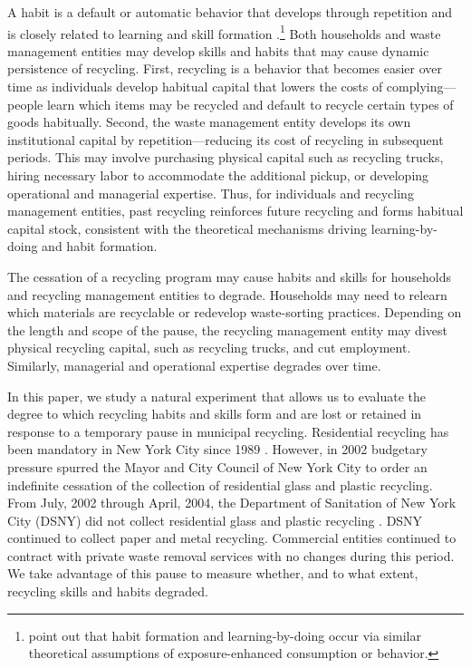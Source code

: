 \documentclass[12pt]{article}
\begin{document}
A habit is a default or automatic behavior that develops through repetition and is closely related to learning and skill formation \citep{woodrunger2016}.\footnote{\cite{alpizaretal2022} point out that habit formation and learning-by-doing occur via similar theoretical assumptions of exposure-enhanced consumption or behavior.} Both households and waste management entities may develop skills and habits that may cause dynamic persistence of recycling.  First, recycling is a behavior that becomes easier over time as individuals develop habitual capital that lowers the costs of complying---people learn which items may be recycled and default to recycle certain types of goods habitually.  Second, the waste management entity develops its own institutional capital by repetition---reducing its cost of recycling in subsequent periods.  This may involve purchasing physical capital such as recycling trucks, hiring necessary labor to accommodate the additional pickup, or developing operational and managerial expertise.  Thus, for individuals and recycling management entities, past recycling reinforces future recycling and forms habitual capital stock, consistent with the theoretical mechanisms driving learning-by-doing and habit formation.

The cessation of a recycling program may cause habits and skills for households and recycling management entities to degrade.  Households may need to relearn which materials are recyclable or redevelop waste-sorting practices.  Depending on the length and scope of the pause, the recycling management entity may divest physical recycling capital, such as recycling trucks, and cut employment.  Similarly, managerial and operational expertise degrades over time.

In this paper, we study a natural experiment that allows us to evaluate the degree to which recycling habits and skills form and are lost or retained in response to a temporary pause in municipal recycling.  Residential recycling has been mandatory in New York City since 1989 \citep{lubasch1989,macbride2004}.  However, in 2002 budgetary pressure spurred the Mayor and City Council of New York City to order an indefinite cessation of the collection of residential glass and plastic recycling.  From July, 2002 through April, 2004, the Department of Sanitation of New York City (DSNY) did not collect residential glass and plastic recycling \citep{macbride2004}.  DSNY continued to collect paper and metal recycling.  Commercial entities continued to contract with private waste removal services with no changes during this period.  We take advantage of this pause to measure whether, and to what extent, recycling skills and habits degraded.
\end{document}

